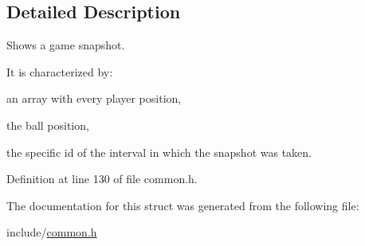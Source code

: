\subsection{Detailed Description}
Shows a game snapshot. 

It is characterized by\+:
\begin{DoxyItemize}
\item an array with every player position,
\item the ball position,
\item the specific id of the interval in which the snapshot was taken. 
\end{DoxyItemize}

Definition at line 130 of file common.\+h.



The documentation for this struct was generated from the following file\+:\begin{DoxyCompactItemize}
\item 
include/\mbox{\hyperlink{common_8h}{common.\+h}}\end{DoxyCompactItemize}
